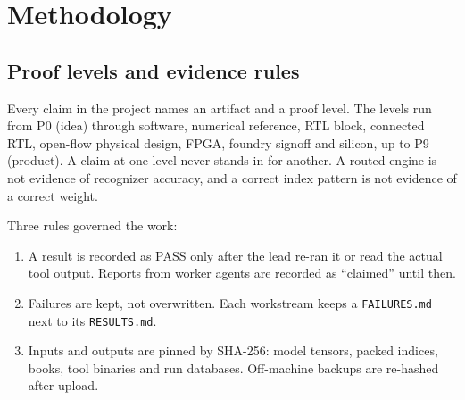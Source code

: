 \section{Methodology}
\label{sec:method}

\subsection{Proof levels and evidence rules}
Every claim in the project names an artifact and a proof level. The levels run from P0 (idea) through software, numerical reference, RTL block, connected RTL, open-flow physical design, FPGA, foundry signoff and silicon, up to P9 (product). A claim at one level never stands in for another. A routed engine is not evidence of recognizer accuracy, and a correct index pattern is not evidence of a correct weight.

Three rules governed the work:
\begin{enumerate}
\item A result is recorded as PASS only after the lead re-ran it or read the actual tool output. Reports from worker agents are recorded as ``claimed'' until then.
\item Failures are kept, not overwritten. Each workstream keeps a \texttt{FAILURES.md} next to its \texttt{RESULTS.md}.
\item Inputs and outputs are pinned by SHA-256: model tensors, packed indices, books, tool binaries and run databases. Off-machine backups are re-hashed after upload.
\end{enumerate}

